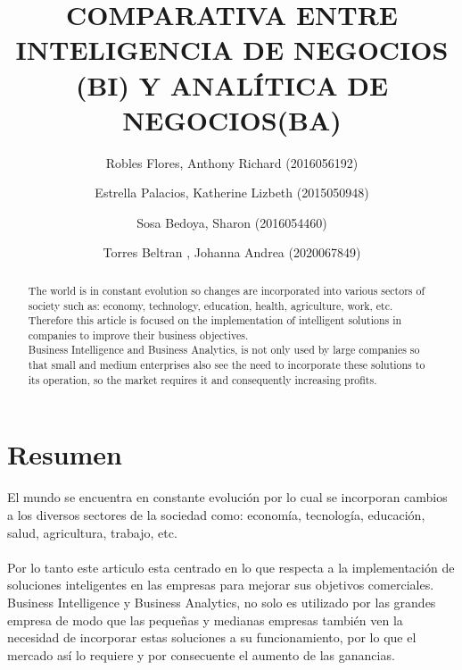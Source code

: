 \documentclass[preprint,12pt]{elsarticle}
\begin{document}
	
	\begin{frontmatter}

		\title{\huge  COMPARATIVA ENTRE INTELIGENCIA DE NEGOCIOS (BI) Y ANALÍTICA DE NEGOCIOS(BA) }
		\author{Robles Flores, Anthony Richard	                (2016056192)}
		\author{Estrella Palacios, Katherine Lizbeth			(2015050948)}
		\author{Sosa Bedoya, Sharon					(2016054460)}
		\author{Torres Beltran , Johanna Andrea			(2020067849)}
		\address{Tacna, Perú}
		


\begin{abstract}
The world is in constant evolution so changes are incorporated into various sectors of society such as: economy, technology, education, health, agriculture, work, etc. 
Therefore this article is focused on the implementation of intelligent solutions in companies to improve their business objectives. 
\\
Business Intelligence and Business Analytics, is not only used by large companies so that small and medium enterprises also see the need to incorporate these solutions to its operation, so the market requires it and consequently increasing profits.
\end{abstract}


\end{frontmatter}

\section{Resumen}
El mundo se encuentra en constante evolución por lo cual se incorporan cambios a los diversos sectores de la sociedad como: economía, tecnología, educación, salud, agricultura, trabajo, etc. 
\\
\\
Por lo tanto este articulo esta centrado en lo que respecta a la implementación de soluciones inteligentes en las empresas para mejorar sus objetivos comerciales. 
Business Intelligence y Business Analytics,  no solo es utilizado por las grandes empresa de modo que las pequeñas y medianas empresas también ven la necesidad de incorporar estas soluciones a su funcionamiento, por lo que el mercado así lo requiere y por consecuente el aumento de las ganancias.


\end{document}
